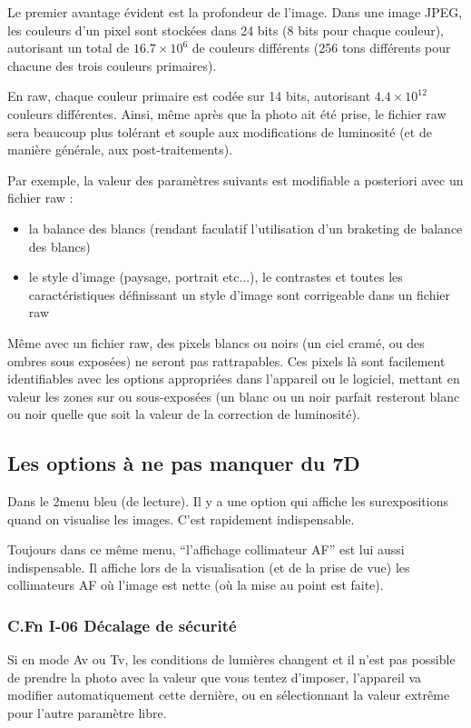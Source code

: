 \documentclass[a4paper,twoside]{article}
\begin{document}
\bigskip

Le premier avantage évident est la profondeur de l'image. Dans une image JPEG, les couleurs d'un pixel sont stockées dans 24 bits (8 bits pour chaque couleur), autorisant un total de $16.7\times 10^{6}$ de couleurs différents (256 tons différents pour chacune des trois couleurs primaires). 

En raw, chaque couleur primaire est codée sur 14 bits, autorisant $4.4\times 10^{12}$ couleurs différentes. Ainsi, même après que la photo ait été prise, le fichier raw sera beaucoup plus tolérant et souple aux modifications de luminosité (et de manière générale, aux post-traitements). 

Par exemple, la valeur des paramètres suivants est modifiable a posteriori avec un fichier raw : 
\begin{itemize}
\item la balance des blancs (rendant faculatif l'utilisation d'un braketing de balance des blancs)
\item le style d'image (paysage, portrait etc...), le contrastes et toutes les caractéristiques définissant un style d'image sont corrigeable dans un fichier raw
\end{itemize}

\begin{attention}
Même avec un fichier raw, des pixels blancs ou noirs (un ciel cramé, ou des ombres sous exposées) ne seront pas rattrapables. Ces pixels là sont facilement identifiables avec les options appropriées dans l'appareil ou le logiciel, mettant en valeur les zones sur ou sous-exposées (un blanc ou un noir parfait resteront blanc ou noir quelle que soit la valeur de la correction de luminosité).
\end{attention}

\subsection{Les options à ne pas manquer du 7D}
Dans le 2\ieme menu bleu (de lecture). Il y a une option qui affiche les surexpositions quand on visualise les images. C'est rapidement indispensable. 

Toujours dans ce même menu, ``l'affichage collimateur AF'' est lui aussi indispensable. Il affiche lors de la visualisation (et de la prise de vue) les collimateurs AF où l'image est nette (où la mise au point est faite). 

\subsubsection{C.Fn I-06 Décalage de sécurité}
Si en mode Av ou Tv, les conditions de lumières changent et il n'est pas possible de prendre la photo avec la valeur que vous tentez d'imposer, l'appareil va modifier automatiquement cette dernière, ou en sélectionnant la valeur extrême pour l'autre paramètre libre. 
\end{document}
